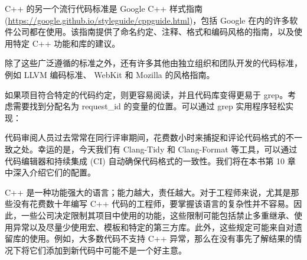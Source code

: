 C++ 的另一个流行代码标准是 Google C++ 样式指南 (\url{https://google.github.io/styleguide/cppguide.html})，包括 Google 在内的许多软件公司都在使用。该指南提供了命名约定、注释、格式和编码风格的指南，以及使用特定 C++ 功能和库的建议。

除了这些广泛遵循的标准之外，还有许多其他由独立组织和团队开发的代码标准，例如 LLVM 编码标准、 WebKit 和 Mozilla 的风格指南。

如果项目符合特定的代码约定，则更容易阅读，并且代码库变得更易于 grep。考虑需要找到分配名为 request\_id 的变量的位置。可以通过 grep 实用程序轻松实现：


代码审阅人员过去常常在同行评审期间，花费数小时来捕捉和评论代码格式的不一致之处。幸运的是，今天我们有 Clang-Tidy 和 Clang-Format 等工具，可以通过代码编辑器和持续集成 (CI) 自动确保代码格式的一致性。我们将在本书第 10 章中深入介绍它们的配置。


C++ 是一种功能强大的语言；能力越大，责任越大。对于工程师来说，尤其是那些没有花费数十年编写 C++ 代码的工程师，要掌握该语言的复杂性并不容易。因此，一些公司决定限制其项目中使用的功能，这些限制可能包括禁止多重继承、使用异常以及尽量少使用宏、模板和特定的第三方库。此外，这些规定可能来自对遗留库的使用。例如，大多数代码不支持 C++ 异常，那么在没有事先了解结果的情况下将它们添加到新代码中可能不是一个好主意。
